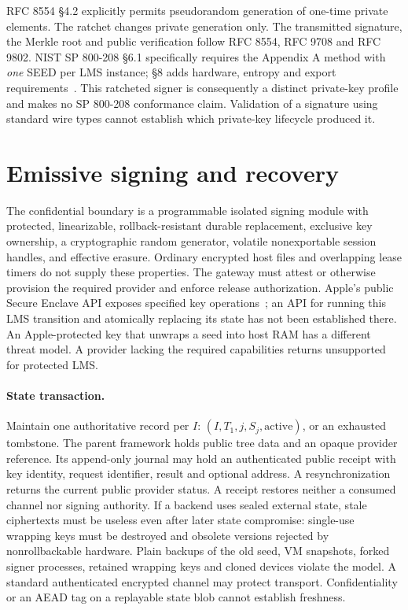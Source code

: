 \documentclass[10pt,twocolumn,letterpaper]{article}
\begin{document}
RFC 8554 \S4.2 explicitly permits pseudorandom generation of one-time private elements. The ratchet changes private generation only. The transmitted signature, the Merkle root and public verification follow RFC 8554, RFC 9708 and RFC 9802. NIST SP 800-208 \S6.1 specifically requires the Appendix A method with \emph{one} SEED per LMS instance; \S8 adds hardware, entropy and export requirements~\cite{nist}. This ratcheted signer is consequently a distinct private-key profile and makes no SP 800-208 conformance claim. Validation of a signature using standard wire types cannot establish which private-key lifecycle produced it.

\section{Emissive signing and recovery}
The confidential boundary is a programmable isolated signing module with protected, linearizable, rollback-resistant durable replacement, exclusive key ownership, a cryptographic random generator, volatile nonexportable session handles, and effective erasure. Ordinary encrypted host files and overlapping lease timers do not supply these properties. The gateway must attest or otherwise provision the required provider and enforce release authorization. Apple's public Secure Enclave API exposes specified key operations~\cite{enclave}; an API for running this LMS transition and atomically replacing its state has not been established there. An Apple-protected key that unwraps a seed into host RAM has a different threat model. A provider lacking the required capabilities returns \textsf{unsupported} for protected LMS.

\paragraph{State transaction.}
Maintain one authoritative record per $I$: $(I,T_1,j,S_j,\mathrm{active})$, or an exhausted tombstone. The parent framework holds public tree data and an opaque provider reference. Its append-only journal may hold an authenticated public receipt with key identity, request identifier, result and optional address. A resynchronization returns the current public provider status. A receipt restores neither a consumed channel nor signing authority. If a backend uses sealed external state, stale ciphertexts must be useless even after later state compromise: single-use wrapping keys must be destroyed and obsolete versions rejected by nonrollbackable hardware. Plain backups of the old seed, VM snapshots, forked signer processes, retained wrapping keys and cloned devices violate the model. A standard authenticated encrypted channel may protect transport. Confidentiality or an AEAD tag on a replayable state blob cannot establish freshness.
\end{document}
